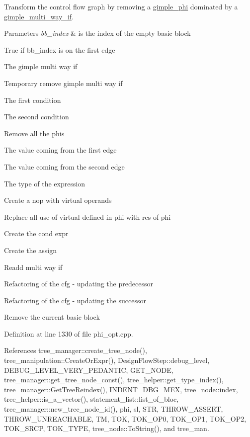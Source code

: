 Transform the control flow graph by removing a \hyperlink{structgimple__phi}{gimple\+\_\+phi} dominated by a \hyperlink{structgimple__multi__way__if}{gimple\+\_\+multi\+\_\+way\+\_\+if}. 


\begin{DoxyParams}{Parameters}
{\em bb\+\_\+index} & is the index of the empty basic block \\
\hline
\end{DoxyParams}
True if bb\+\_\+index is on the first edge

The gimple multi way if

Temporary remove gimple multi way if

The first condition

The second condition

Remove all the phis

The value coming from the first edge

The value coming from the second edge

The type of the expression

Create a nop with virtual operands

Replace all use of virtual defined in phi with res of phi

Create the cond expr

Create the assign

Readd multi way if

Refactoring of the cfg -\/ updating the predecessor

Refactoring of the cfg -\/ updating the successor

Remove the current basic block 

Definition at line 1330 of file phi\+\_\+opt.\+cpp.



References tree\+\_\+manager\+::create\+\_\+tree\+\_\+node(), tree\+\_\+manipulation\+::\+Create\+Or\+Expr(), Design\+Flow\+Step\+::debug\+\_\+level, D\+E\+B\+U\+G\+\_\+\+L\+E\+V\+E\+L\+\_\+\+V\+E\+R\+Y\+\_\+\+P\+E\+D\+A\+N\+T\+IC, G\+E\+T\+\_\+\+N\+O\+DE, tree\+\_\+manager\+::get\+\_\+tree\+\_\+node\+\_\+const(), tree\+\_\+helper\+::get\+\_\+type\+\_\+index(), tree\+\_\+manager\+::\+Get\+Tree\+Reindex(), I\+N\+D\+E\+N\+T\+\_\+\+D\+B\+G\+\_\+\+M\+EX, tree\+\_\+node\+::index, tree\+\_\+helper\+::is\+\_\+a\+\_\+vector(), statement\+\_\+list\+::list\+\_\+of\+\_\+bloc, tree\+\_\+manager\+::new\+\_\+tree\+\_\+node\+\_\+id(), phi, sl, S\+TR, T\+H\+R\+O\+W\+\_\+\+A\+S\+S\+E\+RT, T\+H\+R\+O\+W\+\_\+\+U\+N\+R\+E\+A\+C\+H\+A\+B\+LE, TM, T\+OK, T\+O\+K\+\_\+\+O\+P0, T\+O\+K\+\_\+\+O\+P1, T\+O\+K\+\_\+\+O\+P2, T\+O\+K\+\_\+\+S\+R\+CP, T\+O\+K\+\_\+\+T\+Y\+PE, tree\+\_\+node\+::\+To\+String(), and tree\+\_\+man.



